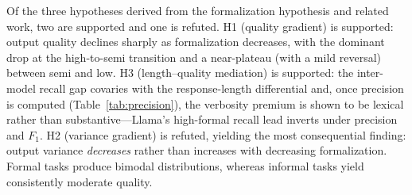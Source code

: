 \documentclass[runningheads]{llncs}
\begin{document}
Of the three hypotheses derived from the formalization hypothesis and related work, two are supported and one is refuted. H1 (quality gradient) is supported: output quality declines sharply as formalization decreases, with the dominant drop at the high-to-semi transition and a near-plateau (with a mild reversal) between semi and low.
H3 (length--quality mediation) is supported: the inter-model recall gap covaries with the response-length differential and, once precision is computed (Table~\ref{tab:precision}), the verbosity premium is shown to be lexical rather than substantive---Llama's high-formal recall lead inverts under precision and $F_1$. H2 (variance gradient) is refuted, yielding the most consequential finding: output variance \emph{decreases} rather than increases with decreasing formalization.
Formal tasks produce bimodal 
distributions, whereas informal tasks yield consistently moderate quality.


\end{document}
